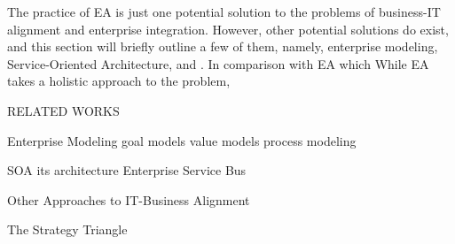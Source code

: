 The practice of EA is just one potential solution to the problems of business-IT alignment and enterprise integration. However, other potential solutions do exist, and this section will briefly outline a few of them, namely, enterprise modeling, Service-Oriented Architecture, and . In comparison with EA which While EA takes a holistic approach to the problem, 


RELATED WORKS

Enterprise Modeling
  goal models
  value models
  process modeling
  

SOA
  its architecture
  Enterprise Service Bus


Other Approaches to IT-Business Alignment
  
  The Strategy Triangle
